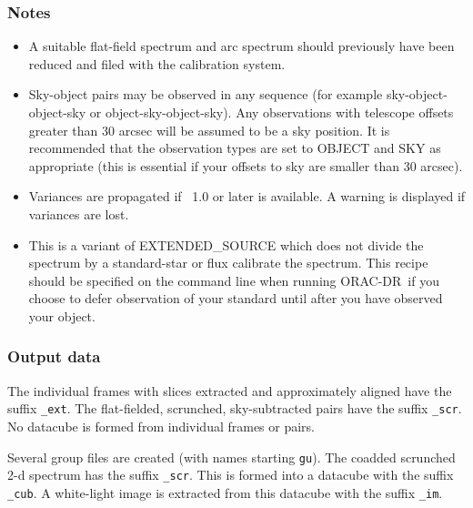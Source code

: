 \documentclass[twoside,11pt,nolof]{starlink}
\providecommand{\KAPPA}{\xref{{\sc{Kappa}}}{sun95}{}}
\providecommand{\ORACDR}{{\footnotesize ORAC-DR}}
\begin{document}
\subsubsection*{Notes}\begin{itemize}
\item

  A suitable flat-field spectrum and arc spectrum should previously
  have been reduced and filed with the calibration system.

\item

  Sky-object pairs may be observed in any sequence (for example
  sky-object-object-sky or object-sky-object-sky). Any observations
  with telescope offsets greater than 30 arcsec will be assumed to be
  a sky position. It is recommended that the observation types are set
  to OBJECT and SKY as appropriate (this is essential if your offsets
  to sky are smaller than 30 arcsec).

\item

Variances are propagated if \KAPPA\ 1.0 or later is available. A warning
is displayed if variances are lost.


\item

  This is a variant of EXTENDED\_SOURCE which does not divide the
  spectrum by a standard-star or flux calibrate the spectrum. This
  recipe should be specified on the command line when running
  \ORACDR\ if you choose to defer observation of your standard until
  after you have observed your object.

\end{itemize}

\subsubsection*{Output data}

The individual frames with slices extracted and approximately aligned
have the suffix \texttt{\_ext}. The flat-fielded, scrunched,
sky-subtracted pairs have the suffix \texttt{\_scr}. No datacube is
formed from individual frames or pairs.

Several group files are created (with names starting \texttt{gu}). The
coadded scrunched 2-d spectrum has the suffix \texttt{\_scr}. This is
formed into a datacube with the suffix \texttt{\_cub}. A white-light image is
extracted from this datacube with the suffix \texttt{\_im}.
\end{document}
